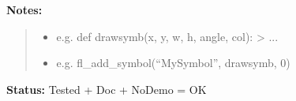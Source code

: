 \begin{boxedminipage}{\funcwidth}
\begin{quote}
      \end{quote}

\textbf{Notes:}
\begin{quote}
  \begin{itemize}

  \item
    \setlength{\parskip}{0.6ex}

e.g. def drawsymb(x, y, w, h, angle, col): > ...


  \item 
e.g. fl\_add\_symbol(``MySymbol'', drawsymb, 0)


\end{itemize}

\end{quote}

\textbf{Status:} 
Tested + Doc + NoDemo = OK


    \end{boxedminipage}

    \label{xformslib:flbasic:fl_draw_symbol}

    \vspace{0.5ex}


